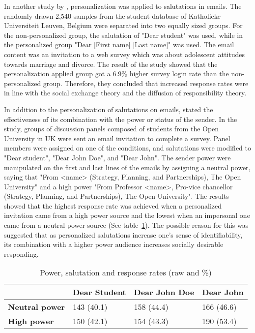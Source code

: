 In another study by \cite{Heerwegh2005}, personalization was applied to salutations in emails. The randomly drawn 2,540 samples from the student database of Katholieke Universiteit Leuven, Belgium were separated into two equally sized groups. For the non-personalized group, the salutation of "Dear student" was used, while in the personalized group "Dear [First name] [Last name]" was used. The email content was an invitation to a web survey which was about adolescent attitudes towards marriage and divorce. The result of the study showed that the personalization applied group got a 6.9\% higher survey login rate than the non-personalized group. Therefore, they concluded that increased response rates were in line with the social exchange theory and the diffusion of responsibility theory.
\vspace{1cm}

In addition to the personalization of salutations on emails, \cite{Joinson2007} stated the effectiveness of its combination with the power or status of the sender. In the study, groups of discussion panels composed of students from the Open University in UK were sent an email invitation to complete a survey. Panel members were assigned on one of the conditions, and salutations were modified to "Dear student", "Dear John Doe", and "Dear John". The sender power were manipulated on the first and last lines of the emails by assigning a neutral power, saying that "From <name> (Strategy, Planning, and Partnerships), The Open University" and a high power "From Professor <name>, Pro-vice chancellor (Strategy, Planning, and Partnerships), The Open University". The results showed that the highest response rate was achieved when a personalized invitation came from a high power source and the lowest when an impersonal one came from a neutral power source (See table~\ref{tab:pow_sal_res}). The possible reason for this was suggested that as personalized salutations increase one's sense of identifiability, its combination with a higher power audience increases socially desirable responding.

\begin{table}[!ht]
\begin{center}
	\caption[Power, salutation and response rates (raw and \%)]{Power, salutation and response rates (raw and \%) \citep{Joinson2007}} \label{tab:pow_sal_res}
    \begin{tabular}{ p{3cm} p{3cm}  p{3cm}  p{3cm} }
	\hline
	& \textbf{Dear Student} & \textbf{Dear John Doe} & \textbf{Dear John} \\ \hline
	\textbf{Neutral power} & 143 (40.1) & 158 (44.4) & 166 (46.6) \\
	\textbf{High power} & 150 (42.1) & 154 (43.3) & 190 (53.4) \\ \hline
    \end{tabular}
\end{center}
\end{table}

